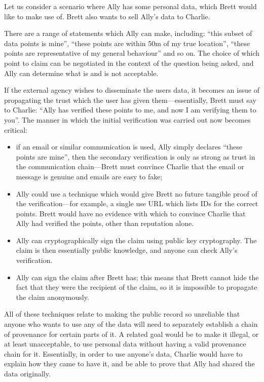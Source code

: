 \documentclass{IOS-Book-Article}     %
\begin{document}
Let us consider a scenario where Ally has some personal data, which Brett would
like to make use of. Brett also wants to sell Ally's data to Charlie.

There are a range of statements which Ally can make, 
including:
``this subset of data points is mine'',
``these points are within 50m of my true location'',
``these points are representative of my general behaviour'' and so on. 
The choice of which point to claim can be negotiated
in the context of the question being asked, and Ally can determine what is
and is not acceptable.

If the external agency wishes to disseminate the users data, it becomes an issue
of propagating the trust which the user has given them---essentially, Brett must
say to Charlie: ``Ally has verified these points to me, and now I am
verifying them to you''. The manner in which the initial verification was carried out now becomes
critical:
\begin{itemize}
  \item if an email or similar communication is used, Ally simply declares
  ``these points are mine'', then the secondary verification is only as strong as
  trust in the communication chain---Brett must convince Charlie that the email
  or message is genuine and emails are easy to fake;
  \item Ally could use a technique which would give Brett no future tangible
  proof of the verification---for example, a single use URL which
  lists IDs for the correct points. Brett would have no evidence with which to
  convince Charlie that Ally had verified the points, other than reputation
  alone.
  \item Ally can cryptographically sign the claim using public key cryptography.
  The claim is then essentially public knowledge, and anyone can check Ally's verification.
  \item Ally can sign the claim after Brett has; this means that Brett cannot
  hide the fact that they were the recipient of the claim, so it is impossible
  to propagate the claim anonymously.
\end{itemize}

All of these techniques relate to making the public record so unreliable that
anyone who wants to use any of the data will need to separately establish a
chain of provenance for certain parts of it. A related goal would be to make it
illegal, or at least unacceptable, to use personal data without having a valid
provenance chain for it. Essentially, in order to use anyone's data, Charlie
would have to explain how they came to have it, and be able to prove that Ally
had shared the data originally.
\end{document}
